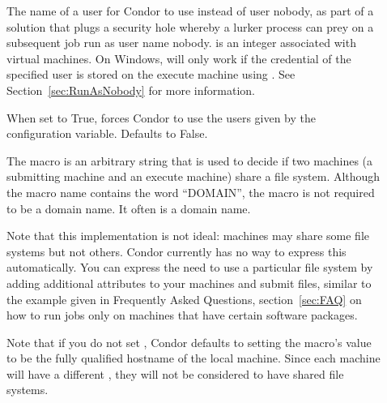 \begin{description}
\item[] \label{param:VMxUser}
  The name of a user for Condor to use instead of
  user nobody,
  as part of a solution that plugs a security hole whereby
  a lurker process can prey on a subsequent job run as user name nobody. 
   is an integer associated with virtual machines.
  On Windows, 
  will only work if the credential of the specified
  user is stored on the execute machine using .
  See Section~\ref{sec:RunAsNobody} for more information.

\item[]
  \label{param:ExecuteLoginIsDedicated}
  When set to True,
  forces Condor to use the users given by the 
  configuration variable.
  Defaults to False.

\item[] \label{param:FilesystemDomain}
  The 
  macro is an arbitrary string that is used to decide if
  two machines (a submitting machine and an execute machine) share a
  file system.
  Although the macro name contains the word ``DOMAIN'',
  the macro is not required to be a domain name. 
  It often is a domain name.


  Note that this implementation is not ideal: machines may share some
  file systems but not others. Condor currently has no way to express
  this automatically. You can express the need to use a
  particular file system by adding additional attributes to your machines
  and submit files, similar to the example given in 
  Frequently Asked Questions, 
  section~\ref{sec:FAQ} on
  how to run jobs only on machines that have 
  certain software packages.

  Note that if you do not set 
  , Condor defaults
  to setting the macro's value to be the fully qualified hostname
  of the local machine.
  Since each machine will have a different
  ,
  they will not be considered to have shared file systems.


\end{description}
